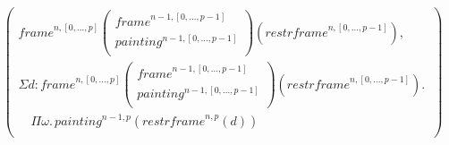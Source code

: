 \documentclass{article}
\newcommand{\myframe}{\mathit{frame}}
\newcommand{\painting}{\mathit{painting}}
\newcommand{\restrframe}{\mathit{restrframe}}
\begin{document}
\begin{itemize}
$$\begin{array}{llcl}
            \left(\begin{array}{l}
                      \myframe^{n,[0,...,p]}
                      \left(\begin{array}{l}
                          \myframe^{n-1,[0,...,p-1]}  \\
                          \painting^{n-1,[0,...,p-1]} \\
                        \end{array}\right)(\restrframe^{n,[0,...,p-1]}), \\
                      \Sigma d:\myframe^{n,[0,...,p]}
                      \left(\begin{array}{l}
                          \myframe^{n-1,[0,...,p-1]}  \\
                          \painting^{n-1,[0,...,p-1]} \\
                        \end{array}\right)(\restrframe^{n,[0,...,p-1]}).\, \\
                      \quad \Pi\omega.\,\painting^{n-1,p}(\restrframe^{n,p}(d))     \\
                    \end{array}\right)                    \\
          \end{array}
        $$


\end{itemize}
\end{document}
